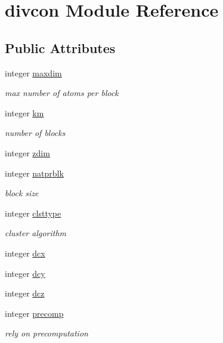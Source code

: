 \hypertarget{classdivcon}{\section{divcon Module Reference}
\label{classdivcon}
}
\subsection*{Public Attributes}
\begin{DoxyCompactItemize}
\item 
integer \hyperlink{classdivcon_ad02ff9537429bbaeb6361a9d36339c86}{maxdim}
\begin{DoxyCompactList}\small\item\em max number of atoms per block \end{DoxyCompactList}\item 
integer \hyperlink{classdivcon_ab4439f8aee99be1a5ba1f14c1e228616}{km}
\begin{DoxyCompactList}\small\item\em number of blocks \end{DoxyCompactList}\item 
integer \hyperlink{classdivcon_a6e44fc423e7b02b063c883e0e4f964ff}{zdim}
\item 
integer \hyperlink{classdivcon_a56d6b8747f40bfa7bf92740878cf7b50}{natprblk}
\begin{DoxyCompactList}\small\item\em block size \end{DoxyCompactList}\item 
integer \hyperlink{classdivcon_ae45ec52c665839ab4eb37dd153149e30}{clsttype}
\begin{DoxyCompactList}\small\item\em cluster algorithm \end{DoxyCompactList}\item 
integer \hyperlink{classdivcon_a6a2fe3c40a79e9864b137eae55c5f687}{dcx}
\item 
integer \hyperlink{classdivcon_addaa1eb83cb76de9e77d18be1572e1bc}{dcy}
\item 
integer \hyperlink{classdivcon_a57e33b1ad8fb8c9cd294d6ebb7be1733}{dcz}
\item 
integer \hyperlink{classdivcon_a558a265882b7e0d8303f780148834195}{precomp}
\begin{DoxyCompactList}\small\item\em rely on precomputation \end{DoxyCompactList}\item 

\end{DoxyCompactItemize}
